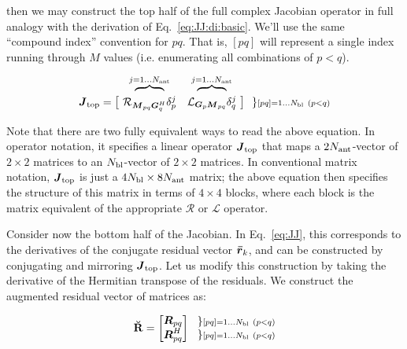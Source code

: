 \documentclass[useAMS,usenatbib]{mn2e}
\newcommand{\rrc}{\bmath{\bar r}}
\newcommand{\mat}[1]{{\bmath{#1}}}
\newcommand{\JJ}{\mat{J}} %
\newcommand{\MM}{\mat{M}}
\newcommand{\RR}{\mat{R}}
\newcommand{\GG}{\mat{G}}
\begin{document}
then we may construct the top half of the full complex Jacobian operator in full analogy with the 
derivation of Eq.~\ref{eq:JJ:di:basic}. We'll use the same ``compound index'' convention for $pq$. That is, 
$[pq]$ will represent a single index running through $M$ values (i.e. enumerating all combinations of $p<q$).

\begin{equation}
\label{eq:JJtop}
\begin{array}{r@{~}cc@{~}cc}
  & \overbrace{~~~~~~~~}^{j=1\dots \Na} & \overbrace{~~~~~~~~}^{j=1\dots \Na} \\

\JJ_\mathrm{top} = \big [ & 
\Rop{ \MM_{pq}\GG^H_q }\delta^j_p & 
\Lop{ \GG_p \MM_{pq}  }\delta^j_q 
& \big ] ~~ \} \scriptstyle [pq]=1\dots \Nbl~(p<q)
% 
\end{array}
\end{equation}

Note that there are two fully equivalent ways to read the above equation. In operator notation, it specifies a linear operator $\JJ_\mathrm{top}$
that maps a $2N_\mathrm{ant}$-vector of $2\times2$ matrices to an $N_\mathrm{bl}$-vector of $2\times2$ matrices. In conventional matrix notation, 
$\JJ_\mathrm{top}$ is just a $4N_\mathrm{bl}\times8N_\mathrm{ant}$ matrix; the above equation then specifies the structure of this matrix in terms
of $4\times4$ blocks, where each block is the matrix equivalent of the appropriate $\mathcal{R}$ or $\mathcal{L}$ operator.

Consider now the bottom half of the Jacobian. In Eq.~\ref{eq:JJ}, this corresponds to the derivatives of the conjugate residual
vector $\rrc_k$, and can be constructed by conjugating and mirroring $\JJ_\mathrm{top}$. Let us modify this construction 
by taking the derivative of the Hermitian transpose of the residuals. We construct the augmented residual vector of matrices
as:

\begin{equation}
\RRr = 
\Matrix{c}{
  \RR_{pq} \\ 
  \RR^H_{pq} 
} 
~~ 
\Stack{ 
\} \scriptstyle [pq]=1\dots \Nbl~(p<q) \\ 
\} \scriptstyle [pq]=1\dots \Nbl~(p<q) 
}
\label{eq:RRtranspose}
\end{equation}

\end{document}
